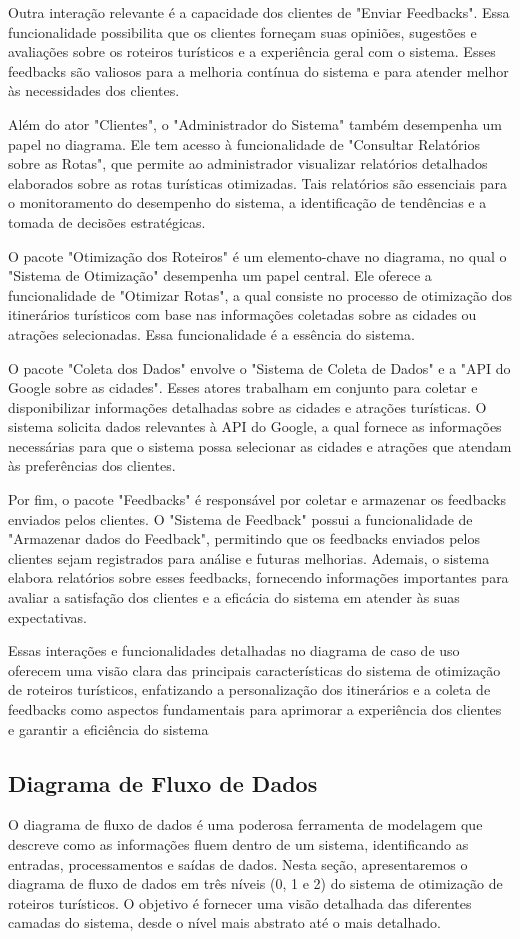Outra interação relevante é a capacidade dos clientes de "Enviar Feedbacks". Essa funcionalidade possibilita que os clientes forneçam suas opiniões, sugestões e avaliações sobre os roteiros turísticos e a experiência geral com o sistema. Esses feedbacks são valiosos para a melhoria contínua do sistema e para atender melhor às necessidades dos clientes.

Além do ator "Clientes", o "Administrador do Sistema" também desempenha um papel no diagrama. Ele tem acesso à funcionalidade de "Consultar Relatórios sobre as Rotas", que permite ao administrador visualizar relatórios detalhados elaborados sobre as rotas turísticas otimizadas. Tais relatórios são essenciais para o monitoramento do desempenho do sistema, a identificação de tendências e a tomada de decisões estratégicas.

O pacote "Otimização dos Roteiros" é um elemento-chave no diagrama, no qual o "Sistema de Otimização" desempenha um papel central. Ele oferece a funcionalidade de "Otimizar Rotas", a qual consiste no processo de otimização dos itinerários turísticos com base nas informações coletadas sobre as cidades ou atrações selecionadas. Essa funcionalidade é a essência do sistema.

O pacote "Coleta dos Dados" envolve o "Sistema de Coleta de Dados" e a "API do Google sobre as cidades". Esses atores trabalham em conjunto para coletar e disponibilizar informações detalhadas sobre as cidades e atrações turísticas. O sistema solicita dados relevantes à API do Google, a qual fornece as informações necessárias para que o sistema possa selecionar as cidades e atrações que atendam às preferências dos clientes.

Por fim, o pacote "Feedbacks" é responsável por coletar e armazenar os feedbacks enviados pelos clientes. O "Sistema de Feedback" possui a funcionalidade de "Armazenar dados do Feedback", permitindo que os feedbacks enviados pelos clientes sejam registrados para análise e futuras melhorias. Ademais, o sistema elabora relatórios sobre esses feedbacks, fornecendo informações importantes para avaliar a satisfação dos clientes e a eficácia do sistema em atender às suas expectativas.

Essas interações e funcionalidades detalhadas no diagrama de caso de uso oferecem uma visão clara das principais características do sistema de otimização de roteiros turísticos, enfatizando a personalização dos itinerários e a coleta de feedbacks como aspectos fundamentais para aprimorar a experiência dos clientes e garantir a eficiência do sistema

\subsection{Diagrama de Fluxo de Dados}

O diagrama de fluxo de dados é uma poderosa ferramenta de modelagem que descreve como as informações fluem dentro de um sistema, identificando as entradas, processamentos e saídas de dados. Nesta seção, apresentaremos o diagrama de fluxo de dados em três níveis (0, 1 e 2) do sistema de otimização de roteiros turísticos. O objetivo é fornecer uma visão detalhada das diferentes camadas do sistema, desde o nível mais abstrato até o mais detalhado.